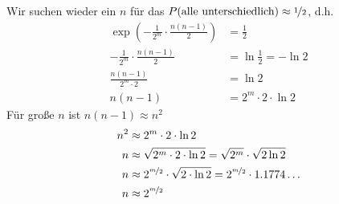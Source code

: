 Wir suchen wieder ein $n$ für das $P(\text{alle unterschiedlich}) \approx \nicefrac{1}{2}$, d.h.
\begin{align*}
    \exp \left(-\frac{1}{2^m}\cdot\frac{n(n-1)}{2}\right) &= \frac{1}{2}\\
    -\frac{1}{2^m}\cdot\frac{n(n-1)}{2} &= \ln \frac{1}{2} = -\ln 2\\
    \frac{n(n-1)}{2^m \cdot 2} &= \ln 2\\
    n(n-1) &= 2^m\cdot 2\cdot \ln 2
\end{align*}
Für große $n$ ist $n(n-1)\approx n^2$
\begin{align*}
    n^2 &\approx 2^m \cdot 2\cdot \ln 2\\
    n &\approx \sqrt{2^m \cdot 2\cdot \ln 2} = \sqrt{2^m} \cdot \sqrt{2\ln 2}\\
    n &\approx 2^{\nicefrac{m}{2}}\cdot\sqrt{2\cdot\ln 2} = 2^{\nicefrac{m}{2}}\cdot 1.1774\dots\\
    n &\approx 2^{\nicefrac{m}{2}}
\end{align*}
